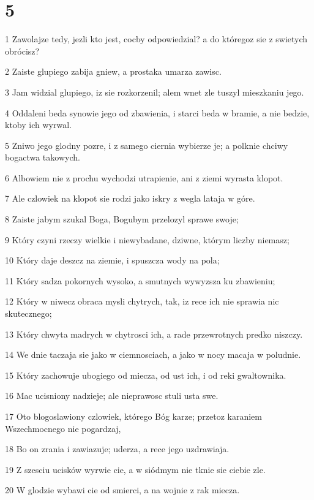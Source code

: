 \chapter{5}

\par 1 Zawolajze tedy, jezli kto jest, cocby odpowiedzial? a do któregoz sie z swietych obrócisz?
\par 2 Zaiste glupiego zabija gniew, a prostaka umarza zawisc.
\par 3 Jam widzial glupiego, iz sie rozkorzenil; alem wnet zle tuszyl mieszkaniu jego.
\par 4 Oddaleni beda synowie jego od zbawienia, i starci beda w bramie, a nie bedzie, ktoby ich wyrwal.
\par 5 Zniwo jego glodny pozre, i z samego ciernia wybierze je; a polknie chciwy bogactwa takowych.
\par 6 Albowiem nie z prochu wychodzi utrapienie, ani z ziemi wyrasta klopot.
\par 7 Ale czlowiek na klopot sie rodzi jako iskry z wegla lataja w góre.
\par 8 Zaiste jabym szukal Boga, Bogubym przelozyl sprawe swoje;
\par 9 Który czyni rzeczy wielkie i niewybadane, dziwne, którym liczby niemasz;
\par 10 Który daje deszcz na ziemie, i spuszcza wody na pola;
\par 11 Który sadza pokornych wysoko, a smutnych wywyzsza ku zbawieniu;
\par 12 Który w niwecz obraca mysli chytrych, tak, iz rece ich nie sprawia nic skutecznego;
\par 13 Który chwyta madrych w chytrosci ich, a rade przewrotnych predko niszczy.
\par 14 We dnie taczaja sie jako w ciemnosciach, a jako w nocy macaja w poludnie.
\par 15 Który zachowuje ubogiego od miecza, od ust ich, i od reki gwaltownika.
\par 16 Mac ucisniony nadzieje; ale nieprawosc stuli usta swe.
\par 17 Oto blogoslawiony czlowiek, którego Bóg karze; przetoz karaniem Wszechmocnego nie pogardzaj,
\par 18 Bo on zrania i zawiazuje; uderza, a rece jego uzdrawiaja.
\par 19 Z szesciu ucisków wyrwie cie, a w siódmym nie tknie sie ciebie zle.
\par 20 W glodzie wybawi cie od smierci, a na wojnie z rak miecza.
